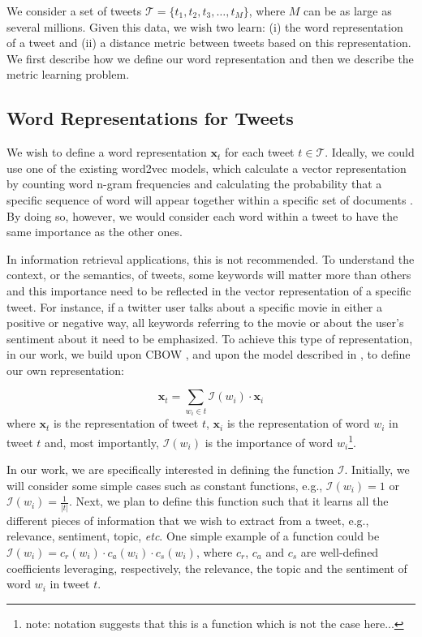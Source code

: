 \documentclass[letterpaper]{article}
\begin{document}
We consider a set of tweets $\mathcal{T} = \{ t_1, t_2, t_3, \dots, t_M \}$, where $M$ can be as large as several millions. Given this data, we wish two learn: (i) the word representation of a tweet and (ii) a distance metric between tweets based on this representation. We first describe how we define our word representation and then we describe the metric learning problem.

\subsection{Word Representations for Tweets}

We wish to define a word representation $\mathbf{x}_t$ for each tweet $t \in \mathcal{T}$. Ideally, we could use one of the existing word2vec models, which calculate a vector representation by counting word n-gram frequencies and calculating the probability that a specific sequence of word will appear together within a specific set of documents \cite{Mikolov2013a}. By doing so, however, we would consider each word within a tweet to have the same importance as the other ones. 

In information retrieval applications, this is not recommended. To understand the context, or the semantics, of tweets, some keywords will matter more than others and this importance need to be reflected in the vector representation of a specific tweet. For instance, if a twitter user talks about a specific movie in either a positive or negative way, all keywords referring to the movie or about the user's sentiment about it need to be emphasized.  To achieve this type of representation, in our work, we build upon CBOW \cite{Mikolov2013a}, and upon the model described in \cite{Ling2015a}, to define our own representation: 

\begin{equation}
\mathbf{x}_t  = \sum_{w_i \in t} \mathcal{I}(w_i) \cdot \mathbf{x}_i 
\label{eq:sum_of_words}
\end{equation}
where $\mathbf{x}_t$ is the representation of tweet $t$, $\mathbf{x}_i$ is the representation of word $w_i$ in tweet $t$ and, most importantly, $\mathcal{I}(w_i)$ is the importance of word $w_i$\footnote{note: notation suggests that this is a function which is not the case here...}.  

In our work, we are specifically interested in defining the function $\mathcal{I}$. Initially, we will consider some simple cases such as constant functions, e.g., $\mathcal{I}(w_i) = 1$ or $\mathcal{I}(w_i) = \frac{1}{|t|}$. Next, we plan to define this function such that it learns all the different pieces of information that we wish to extract from a tweet, e.g., relevance, sentiment, topic, \emph{etc}.  One simple example of a function could be $\mathcal{I}(w_i) = c_{r} (w_i) \cdot c_{a} (w_i) \cdot c_{s} (w_i)$, where $c_{r}$, $c_{a}$ and $c_{s}$ are well-defined coefficients leveraging, respectively, the relevance, the topic and the sentiment of word $ w_i$ in tweet $t$. 
\end{document}
